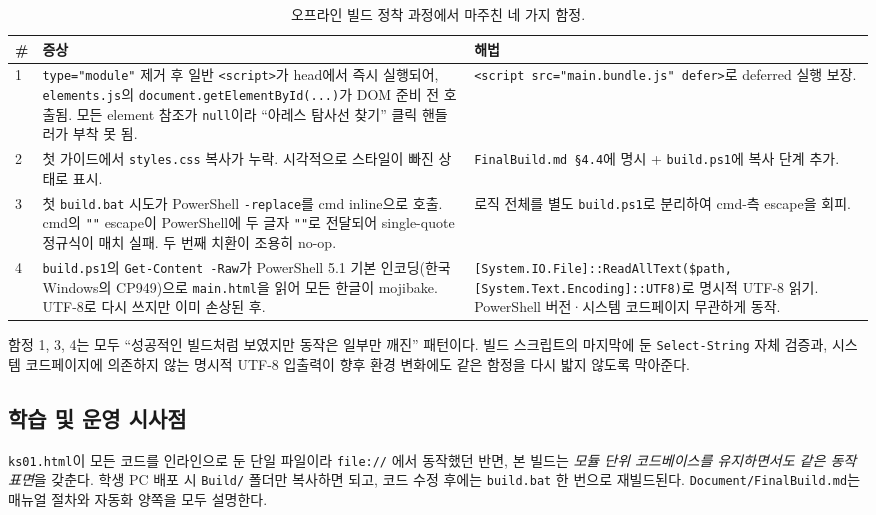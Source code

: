 \documentclass[11pt, oneside]{article}
\begin{document}
\begin{table}[h]
\centering
\small
\begin{tabularx}{\linewidth}{@{}lXX@{}}
\toprule
\# & 증상 & 해법 \\
\midrule
1 & \texttt{type="module"} 제거 후 일반 \texttt{<script>}가 head에서 즉시 실행되어, \texttt{elements.js}의 \texttt{document.getElementById(...)}가 DOM 준비 전 호출됨. 모든 element 참조가 \texttt{null}이라 ``아레스 탐사선 찾기'' 클릭 핸들러가 부착 못 됨. & \texttt{<script src="main.bundle.js" defer>}로 deferred 실행 보장. \\
\midrule
2 & 첫 가이드에서 \texttt{styles.css} 복사가 누락. 시각적으로 스타일이 빠진 상태로 표시. & \texttt{FinalBuild.md \S 4.4}에 명시 + \texttt{build.ps1}에 복사 단계 추가. \\
\midrule
3 & 첫 \texttt{build.bat} 시도가 PowerShell \texttt{-replace}를 cmd inline으로 호출. cmd의 \texttt{""} escape이 PowerShell에 두 글자 \texttt{""}로 전달되어 single-quote 정규식이 매치 실패. 두 번째 치환이 조용히 no-op. & 로직 전체를 별도 \texttt{build.ps1}로 분리하여 cmd-측 escape을 회피. \\
\midrule
4 & \texttt{build.ps1}의 \texttt{Get-Content -Raw}가 PowerShell 5.1 기본 인코딩(한국 Windows의 CP949)으로 \texttt{main.html}을 읽어 모든 한글이 mojibake. UTF-8로 다시 쓰지만 이미 손상된 후. & \texttt{[System.IO.File]::ReadAllText(\$path, [System.Text.Encoding]::UTF8)}로 명시적 UTF-8 읽기. PowerShell 버전·시스템 코드페이지 무관하게 동작. \\
\bottomrule
\end{tabularx}
\caption{오프라인 빌드 정착 과정에서 마주친 네 가지 함정.}
\end{table}

\begin{keypoint}
함정 1, 3, 4는 모두 ``성공적인 빌드처럼 보였지만 동작은 일부만 깨진''
패턴이다. 빌드 스크립트의 마지막에 둔 \texttt{Select-String} 자체
검증과, 시스템 코드페이지에 의존하지 않는 명시적 UTF-8 입출력이 향후
환경 변화에도 같은 함정을 다시 밟지 않도록 막아준다.
\end{keypoint}

\subsection{학습 및 운영 시사점}

\texttt{ks01.html}이 모든 코드를 인라인으로 둔 단일 파일이라 \texttt{file://}
에서 동작했던 반면, 본 빌드는 \emph{모듈 단위 코드베이스를 유지하면서도
같은 동작 표면}을 갖춘다. 학생 PC 배포 시 \texttt{Build/} 폴더만 복사하면
되고, 코드 수정 후에는 \texttt{build.bat} 한 번으로 재빌드된다.
\texttt{Document/FinalBuild.md}는 매뉴얼 절차와 자동화 양쪽을 모두
설명한다.
\end{document}
